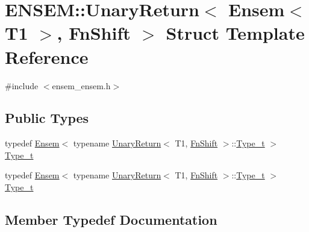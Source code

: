 \hypertarget{structENSEM_1_1UnaryReturn_3_01Ensem_3_01T1_01_4_00_01FnShift_01_4}{}\section{E\+N\+S\+EM\+:\+:Unary\+Return$<$ Ensem$<$ T1 $>$, Fn\+Shift $>$ Struct Template Reference}
\label{structENSEM_1_1UnaryReturn_3_01Ensem_3_01T1_01_4_00_01FnShift_01_4}


{\ttfamily \#include $<$ensem\+\_\+ensem.\+h$>$}

\subsection*{Public Types}
\begin{DoxyCompactItemize}
\item 
typedef \mbox{\hyperlink{classENSEM_1_1Ensem}{Ensem}}$<$ typename \mbox{\hyperlink{structENSEM_1_1UnaryReturn}{Unary\+Return}}$<$ T1, \mbox{\hyperlink{structENSEM_1_1FnShift}{Fn\+Shift}} $>$\+::\mbox{\hyperlink{structENSEM_1_1UnaryReturn_3_01Ensem_3_01T1_01_4_00_01FnShift_01_4_aed1937a9071e7b8f1a036bdb1860c54d}{Type\+\_\+t}} $>$ \mbox{\hyperlink{structENSEM_1_1UnaryReturn_3_01Ensem_3_01T1_01_4_00_01FnShift_01_4_aed1937a9071e7b8f1a036bdb1860c54d}{Type\+\_\+t}}
\item 
typedef \mbox{\hyperlink{classENSEM_1_1Ensem}{Ensem}}$<$ typename \mbox{\hyperlink{structENSEM_1_1UnaryReturn}{Unary\+Return}}$<$ T1, \mbox{\hyperlink{structENSEM_1_1FnShift}{Fn\+Shift}} $>$\+::\mbox{\hyperlink{structENSEM_1_1UnaryReturn_3_01Ensem_3_01T1_01_4_00_01FnShift_01_4_aed1937a9071e7b8f1a036bdb1860c54d}{Type\+\_\+t}} $>$ \mbox{\hyperlink{structENSEM_1_1UnaryReturn_3_01Ensem_3_01T1_01_4_00_01FnShift_01_4_aed1937a9071e7b8f1a036bdb1860c54d}{Type\+\_\+t}}
\end{DoxyCompactItemize}


\subsection{Member Typedef Documentation}
\mbox{\label{structENSEM_1_1UnaryReturn_3_01Ensem_3_01T1_01_4_00_01FnShift_01_4_aed1937a9071e7b8f1a036bdb1860c54d}} 
